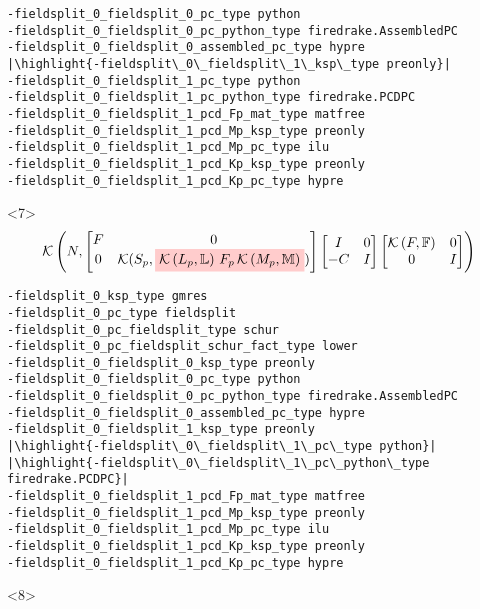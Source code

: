 \documentclass[presentation]{beamer}
\newcommand{\KSP}[2]{\ensuremath{\mathcal{K}\left(#1, \mathbb{#2}\right)}}
\newcommand{\ksp}[1]{\KSP{#1}{#1}}
\newcommand{\highlight}[1]{\colorbox{red!20}{\color{black} #1}}
\begin{document}
\begin{frame}[fragile]
\begin{onlyenv}
\begin{verbatim}
-fieldsplit_0_fieldsplit_0_pc_type python
-fieldsplit_0_fieldsplit_0_pc_python_type firedrake.AssembledPC
-fieldsplit_0_fieldsplit_0_assembled_pc_type hypre
|\highlight{-fieldsplit\_0\_fieldsplit\_1\_ksp\_type preonly}|
-fieldsplit_0_fieldsplit_1_pc_type python
-fieldsplit_0_fieldsplit_1_pc_python_type firedrake.PCDPC
-fieldsplit_0_fieldsplit_1_pcd_Fp_mat_type matfree
-fieldsplit_0_fieldsplit_1_pcd_Mp_ksp_type preonly
-fieldsplit_0_fieldsplit_1_pcd_Mp_pc_type ilu
-fieldsplit_0_fieldsplit_1_pcd_Kp_ksp_type preonly
-fieldsplit_0_fieldsplit_1_pcd_Kp_pc_type hypre
\end{verbatim}
  \end{onlyenv}
  \begin{onlyenv}<7>
    \color{gray}
    \begin{equation*}
      \KSP{N}{%
        \begin{bmatrix}
        F & 0 \\
        0 & \mathcal{K}(S_p, \highlight{$\KSP{L_p}{L}\,F_p \, \KSP{M_p}{M}$})
      \end{bmatrix}
      \begin{bmatrix}
        I & 0\\
        -C & I
      \end{bmatrix}
      \begin{bmatrix}
        \ksp{F} & 0 \\
        0 & I
      \end{bmatrix}}
    \end{equation*}
\begin{verbatim}
-fieldsplit_0_ksp_type gmres
-fieldsplit_0_pc_type fieldsplit
-fieldsplit_0_pc_fieldsplit_type schur
-fieldsplit_0_pc_fieldsplit_schur_fact_type lower
-fieldsplit_0_fieldsplit_0_ksp_type preonly
-fieldsplit_0_fieldsplit_0_pc_type python
-fieldsplit_0_fieldsplit_0_pc_python_type firedrake.AssembledPC
-fieldsplit_0_fieldsplit_0_assembled_pc_type hypre
-fieldsplit_0_fieldsplit_1_ksp_type preonly
|\highlight{-fieldsplit\_0\_fieldsplit\_1\_pc\_type python}|
|\highlight{-fieldsplit\_0\_fieldsplit\_1\_pc\_python\_type firedrake.PCDPC}|
-fieldsplit_0_fieldsplit_1_pcd_Fp_mat_type matfree
-fieldsplit_0_fieldsplit_1_pcd_Mp_ksp_type preonly
-fieldsplit_0_fieldsplit_1_pcd_Mp_pc_type ilu
-fieldsplit_0_fieldsplit_1_pcd_Kp_ksp_type preonly
-fieldsplit_0_fieldsplit_1_pcd_Kp_pc_type hypre
\end{verbatim}
  \end{onlyenv}
  \begin{onlyenv}<8>
    \color{gray}

\end{onlyenv}
\end{frame}
\end{document}
